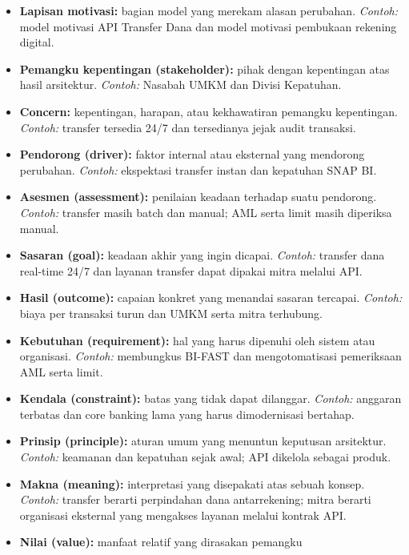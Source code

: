 \begin{itemize}
  \item \textbf{Lapisan motivasi:} bagian model yang merekam alasan perubahan.
        \emph{Contoh:} model motivasi API Transfer Dana dan model motivasi
        pembukaan rekening digital.
  \item \textbf{Pemangku kepentingan (stakeholder):} pihak dengan kepentingan
        atas hasil arsitektur. \emph{Contoh:} Nasabah UMKM dan Divisi Kepatuhan.
  \item \textbf{Concern:} kepentingan, harapan, atau kekhawatiran pemangku
        kepentingan. \emph{Contoh:} transfer tersedia 24/7 dan tersedianya jejak
        audit transaksi.
  \item \textbf{Pendorong (driver):} faktor internal atau eksternal yang
        mendorong perubahan. \emph{Contoh:} ekspektasi transfer instan dan
        kepatuhan SNAP BI.
  \item \textbf{Asesmen (assessment):} penilaian keadaan terhadap suatu
        pendorong. \emph{Contoh:} transfer masih batch dan manual; AML serta
        limit masih diperiksa manual.
  \item \textbf{Sasaran (goal):} keadaan akhir yang ingin dicapai.
        \emph{Contoh:} transfer dana real-time 24/7 dan layanan transfer dapat
        dipakai mitra melalui API.
  \item \textbf{Hasil (outcome):} capaian konkret yang menandai sasaran
        tercapai. \emph{Contoh:} biaya per transaksi turun dan UMKM serta mitra
        terhubung.
  \item \textbf{Kebutuhan (requirement):} hal yang harus dipenuhi oleh sistem
        atau organisasi. \emph{Contoh:} membungkus BI-FAST dan
        mengotomatisasi pemeriksaan AML serta limit.
  \item \textbf{Kendala (constraint):} batas yang tidak dapat dilanggar.
        \emph{Contoh:} anggaran terbatas dan core banking lama yang harus
        dimodernisasi bertahap.
  \item \textbf{Prinsip (principle):} aturan umum yang menuntun keputusan
        arsitektur. \emph{Contoh:} keamanan dan kepatuhan sejak awal; API
        dikelola sebagai produk.
  \item \textbf{Makna (meaning):} interpretasi yang disepakati atas sebuah
        konsep. \emph{Contoh:} transfer berarti perpindahan dana
        antarrekening; mitra berarti organisasi eksternal yang mengakses
        layanan melalui kontrak API.
  \item \textbf{Nilai (value):} manfaat relatif yang dirasakan pemangku

\end{itemize}
